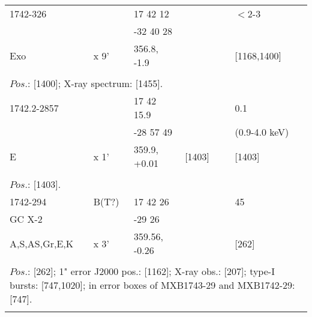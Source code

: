 \documentclass{aa}
\begin{document}
\begin{tabular}{p{2.5cm}p{1cm}p{1.8cm}p{2.3cm}p{3.3cm}p{2.0cm}p{2.2cm}}
\noalign{\smallskip}
1742-326        &                & 17 42 12              &                    &                          & $<$2-3                 &          \\
                         &                & -32 40 28             &                    &                          &                              &         \\
Exo                  & x 9'         & 356.8, -1.9           &                    &                          & [1168,1400]       &         \\
\\
\multicolumn{7}{p{17.5cm}}{
$Pos$.: [1400]; X-ray spectrum: [1455].}\\
\noalign{\smallskip}
\hline

\noalign{\smallskip}
1742.2-2857   &               & 17 42 15.9           &                   &                             & 0.1                            &          \\
                         &               & -28 57 49             &                   &                             & (0.9-4.0 keV)           &         \\
E                      & x 1'       & 359.9, +0.01         & [1403]       &                             & [1403]                      &          \\
\\
\multicolumn{7}{p{17.5cm}}{
$Pos$.: [1403].}\\
\noalign{\smallskip}
\hline

\noalign{\smallskip}
1742-294            & B(T?)        & 17 42 26                 &                    &                      & 45             &           \\
GC X-2                &                   & -29 26                     &                    &                      &                   &               \\
A,S,AS,Gr,E,K  & x 3'            & 359.56, -0.26          &                    &                      & [262]         &         \\
\\
\multicolumn{7}{p{17.5cm}}{
$Pos$.: [262]; 1" error J2000 pos.: [1162]; X-ray obs.: [207]; type-I bursts: [747,1020]; in error boxes of MXB1743-29 
and MXB1742-29: [747].}\\
\noalign{\smallskip}
\hline


\end{tabular}
\end{document}
